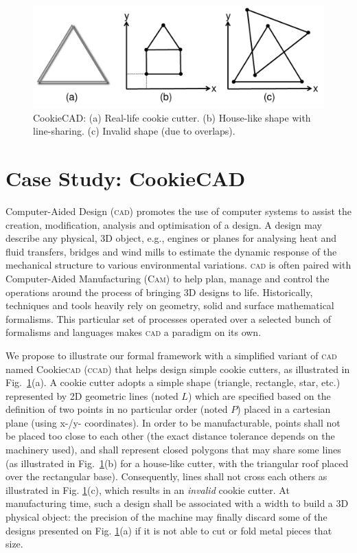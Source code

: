 \begin{figure}[t]
   \centering
   \includegraphics[width=\columnwidth]{CookieCAD.pdf}%
   \vspace{-1em}
   \caption{CookieCAD: (a) Real-life cookie cutter. (b) House-like 
shape with line-sharing. (c) Invalid shape (due to overlaps).}%
   \label{fig:CookieCAD}
\end{figure}

\section{Case Study: CookieCAD}
\label{sec:CS}

\enlargethispage{6pt}


Computer-Aided Design (\textsc{cad}) \cite{B:Groover-Zimmers:2008} promotes the
use of computer systems to assist the creation, modification, analysis and
optimisation of a design.
A design may describe any physical, 3D object, e.g., engines or planes for
analysing heat and fluid transfers, bridges and wind mills to estimate the
dynamic response of the mechanical structure to various environmental
variations. \textsc{cad} is often paired with Computer-Aided Manufacturing
(\textsc{Cam}) to help plan, manage and control the operations around the
process of bringing 3D designs to life. Historically, techniques and tools
heavily rely on geometry, solid and surface mathematical formalisms. This
particular set of processes operated over a selected bunch of formalisms and
languages makes \textsc{cad} a paradigm on its own.

We propose to illustrate our formal framework with a simplified variant of 
\textsc{cad} named Cookie\textsc{cad} (\textsc{ccad}) that helps design simple 
cookie cutters, as illustrated in Fig.~\ref{fig:CookieCAD}(a). A cookie cutter 
adopts a simple shape (triangle, rectangle, star, etc.) represented by 2D geometric 
lines (noted $L$) which are specified based on the definition of two points in 
no particular order (noted $P$) placed in a cartesian plane (using x-/y- 
coordinates). In order to be manufacturable, points shall not be placed too 
close to each other (the exact distance tolerance depends on the machinery 
used), and shall represent closed polygons that may share some lines (as 
illustrated in Fig.~\ref{fig:CookieCAD}(b) for a house-like cutter, with the 
triangular roof placed over the rectangular base). Consequently, lines shall not 
cross each others as illustrated in Fig. \ref{fig:CookieCAD}(c), which results 
in an \emph{invalid} cookie cutter. At manufacturing time, such a design shall 
be associated with a width to build a 3D physical object: the precision of the 
machine may finally discard some of the designs presented on Fig. 
\ref{fig:CookieCAD}(a) if it is not able to cut or fold metal pieces that size.


